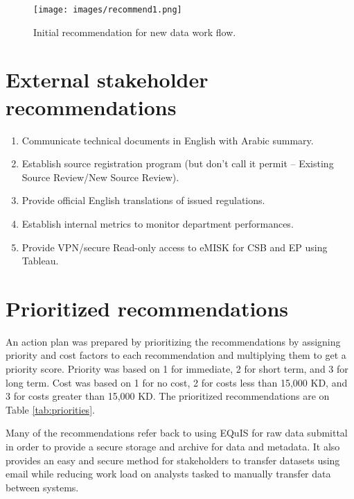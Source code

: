 \begin{figure}[H]
\centering
\texttt{[image: images/recommend1.png]} 
\caption{Initial recommendation for new data work flow.}
\label{fig:recommend1}
\end{figure}

\section{External stakeholder recommendations}
\begin{enumerate}
\item Communicate technical documents in English with Arabic summary.
\item Establish source registration program (but don’t call it permit – Existing Source Review/New Source Review).
\item Provide official English translations of issued regulations.
\item Establish internal metrics to monitor department performances.
\item Provide VPN/secure Read-only access to eMISK for CSB and EP using Tableau.
\end{enumerate}

\section{Prioritized recommendations}

An action plan was prepared by prioritizing the recommendations by assigning priority and cost factors to each recommendation and multiplying them to get a priority score. Priority was based on 1 for immediate, 2 for short term, and 3 for long term. Cost was based on 1 for no cost, 2 for costs less than 15,000 KD, and 3 for costs greater than 15,000 KD. The prioritized recommendations are on Table \ref{tab:priorities}.

Many of the recommendations refer back to using EQuIS for raw data submittal in order to provide a secure storage and archive for data and metadata. It also provides an easy and secure method for stakeholders to transfer datasets using email while reducing work load on analysts tasked to manually transfer data between systems.

